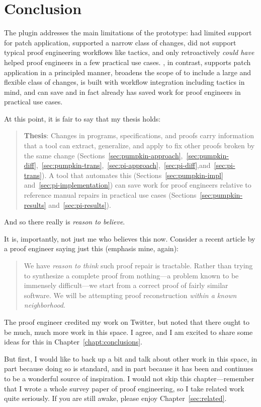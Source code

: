 \section{Conclusion}

The \toolnamec plugin addresses the main limitations of the \sysname prototype:
\sysname had limited support for patch application,
supported a narrow class of changes,
did not support typical proof engineering workflows like tactics,
and only retroactively \textit{could have} helped proof engineers in a few practical use cases.
\toolnamec, in contrast, supports patch application in a principled manner,
broadens the scope of \sysnamelong to include a large and flexible class of changes,
is built with workflow integration including tactics in mind,
and can save and in fact already has saved work for proof engineers in practical use cases.

At this point, it is fair to say that my thesis holds:

\begin{quote}
\textbf{Thesis}: Changes in programs, specifications, and proofs carry information that a tool can extract, generalize, and apply to fix other proofs broken by the same change (Sections~\ref{sec:pumpkin-approach},~\ref{sec:pumpkin-diff},~\ref{sec:pumpkin-trans},~\ref{sec:pi-approach},~\ref{sec:pi-diff},and~\ref{sec:pi-trans}). A tool that automates this (Sections~\ref{sec:pumpkin-impl} and~\ref{sec:pi-implementation}) can save work for proof engineers relative to reference manual repairs in 
practical use cases (Sections~\ref{sec:pumpkin-results} and~\ref{sec:pi-results}).
\end{quote}
And so there really is \textit{reason to believe}. %

It is, importantly, not just me who believes this now.
Consider a recent article by a proof engineer saying just this (emphasis mine, again): %

\begin{quote}
We have \textit{reason to think} such proof repair is tractable. Rather than trying to synthesize a complete proof from nothing---a problem known to be immensely difficult---we 
start from a correct proof of fairly similar software. We will be attempting proof reconstruction \textit{within a known neighborhood}.
\end{quote}
The proof engineer credited my work on Twitter, %
but noted that there ought to be much, much more work in this space.
I agree, and I am excited to share some ideas for this in Chapter~\ref{chapt:conclusions}.

But first, I would like to back up a bit and talk about other work in this space,
in part because doing so is standard, and in part because it has been and continues to be a wonderful source of inspiration.
I would not skip this chapter---remember that I wrote a whole survey paper of proof engineering,
so I take related work quite seriously.
If you are still awake, please enjoy Chapter~\ref{sec:related}.
